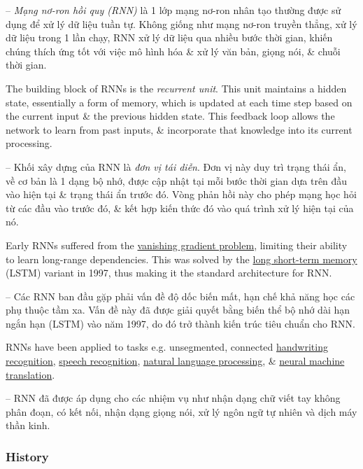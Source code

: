 \documentclass{article}
\begin{document}
-- {\it Mạng nơ-ron hồi quy (RNN)} là 1 lớp mạng nơ-ron nhân tạo thường được sử dụng để xử lý dữ liệu tuần tự. Không giống như mạng nơ-ron truyền thẳng, xử lý dữ liệu trong 1 lần chạy, RNN xử lý dữ liệu qua nhiều bước thời gian, khiến chúng thích ứng tốt với việc mô hình hóa \& xử lý văn bản, giọng nói, \& chuỗi thời gian.

The building block of RNNs is the {\it recurrent unit}. This unit maintains a hidden state, essentially a form of memory, which is updated at each time step based on the current input \& the previous hidden state. This feedback loop allows the network to learn from past inputs, \& incorporate that knowledge into its current processing.

-- Khối xây dựng của RNN là {\it đơn vị tái diễn}. Đơn vị này duy trì trạng thái ẩn, về cơ bản là 1 dạng bộ nhớ, được cập nhật tại mỗi bước thời gian dựa trên đầu vào hiện tại \& trạng thái ẩn trước đó. Vòng phản hồi này cho phép mạng học hỏi từ các đầu vào trước đó, \& kết hợp kiến thức đó vào quá trình xử lý hiện tại của nó.

Early RNNs suffered from the \href{https://en.wikipedia.org/wiki/Vanishing_gradient_problem}{vanishing gradient problem}, limiting their ability to learn long-range dependencies. This was solved by the \href{https://en.wikipedia.org/wiki/Long_short-term_memory}{long short-term memory} (LSTM) variant in 1997, thus making it the standard architecture for RNN.

-- Các RNN ban đầu gặp phải vấn đề độ dốc biến mất, hạn chế khả năng học các phụ thuộc tầm xa. Vấn đề này đã được giải quyết bằng biến thể bộ nhớ dài hạn ngắn hạn (LSTM) vào năm 1997, do đó trở thành kiến trúc tiêu chuẩn cho RNN.

RNNs have been applied to tasks e.g. unsegmented, connected \href{https://en.wikipedia.org/wiki/Handwriting_recognition}{handwriting recognition}, \href{https://en.wikipedia.org/wiki/Speech_recognition}{speech recognition}, \href{https://en.wikipedia.org/wiki/Natural_language_processing}{natural language processing}, \& \href{https://en.wikipedia.org/wiki/Neural_machine_translation}{neural machine translation}.

-- RNN đã được áp dụng cho các nhiệm vụ như nhận dạng chữ viết tay không phân đoạn, có kết nối, nhận dạng giọng nói, xử lý ngôn ngữ tự nhiên và dịch máy thần kinh.

\subsubsection{History}
\end{document}
